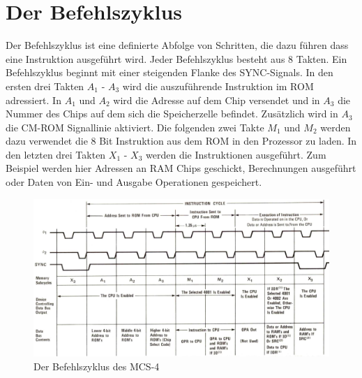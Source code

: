 \section{Der Befehlszyklus}
\label{ch:befehlszyklus}
Der Befehlszyklus ist eine definierte Abfolge von Schritten, die dazu führen dass eine Instruktion ausgeführt wird. Jeder Befehlszyklus besteht aus 8 Takten. Ein Befehlszyklus beginnt mit einer steigenden Flanke des SYNC-Signals. In den ersten drei Takten $A_1$ - $A_3$ wird die auszuführende Instruktion im ROM adressiert. In $A_1$ und $A_2$ wird die Adresse auf dem Chip versendet und in $A_3$ die Nummer des Chips auf dem sich die Speicherzelle befindet. Zusätzlich wird in $A_3$ die CM-ROM Signallinie aktiviert. Die folgenden zwei Takte $M_1$ und $M_2$ werden dazu verwendet die 8 Bit Instruktion aus dem ROM in den Prozessor zu laden. In den letzten drei Takten $X_1$ - $X_3$ werden die Instruktionen ausgeführt. Zum Beispiel werden hier Adressen an RAM Chips geschickt, Berechnungen ausgeführt oder Daten von Ein- und Ausgabe Operationen gespeichert.
 \begin{figure}[ht]
 	\centering
 	\includegraphics[width=1\textwidth]{figures/instruction_cycle.png}
 	\caption{Der Befehlszyklus des MCS-4}
 	\label{fig:cycle}
 \end{figure}

